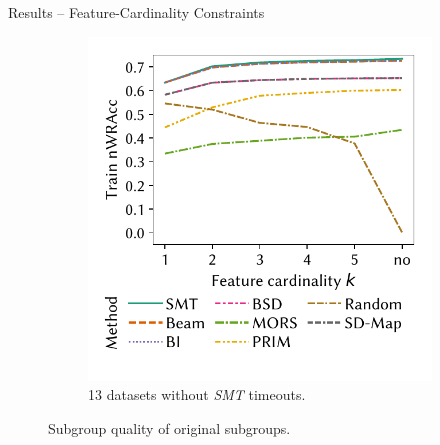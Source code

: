 \documentclass[en, navbaroff, handout]{sdqbeamer}
\begin{document}
\begin{frame}[t]{Results -- Feature-Cardinality Constraints}
\begin{figure}
\begin{subfigure}[t]{0.35\textwidth}
			\centering
			\includegraphics[width=\textwidth, trim=10 25 10 10, clip]{plots/csd-cardinality-train-nwracc-no-timeout-datasets.pdf}
			\caption{13 datasets without \emph{SMT} timeouts.}
			\label{fig:csd:cardinality-train-nwracc-no-timeout-datasets}
		\end{subfigure}
		\caption*{
			Subgroup quality of original subgroups.
		}
		\label{fig:csd:cardinality:main}
	\end{figure}
\end{frame}
\end{document}
